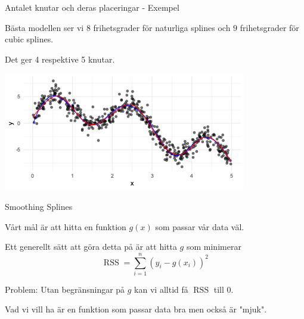 \documentclass[10pt,english]{beamer}
\begin{document}
\begin{frame}{Antalet knutar och deras placeringar - Exempel}

    Bästa modellen ser vi $8$ frihetsgrader för naturliga splines och $9$ frihetsgrader för cubic splines.

    Det ger 4 respektive 5 knutar.

    \includegraphics[width=\textwidth]{figs/bestMSE.png}
    

\end{frame}

\begin{frame}{Smoothing Splines}
    
    \begin{greenbox}
        Vårt mål är att hitta en funktion $g(x)$ som passar vår data väl.
    \end{greenbox}

    Ett generellt sätt att göra detta på är att hitta $g$ som minimerar
    \begin{equation*}
        \operatorname{RSS} = \sum_{i=1}^{n}(y_i - g(x_i))^2
    \end{equation*}

    Problem: Utan begränsningar på $g$ kan vi alltid få $\operatorname{RSS}$ till 0.

    Vad vi vill ha är en funktion som passar data bra men också är "mjuk".

\end{frame}
\end{document}
